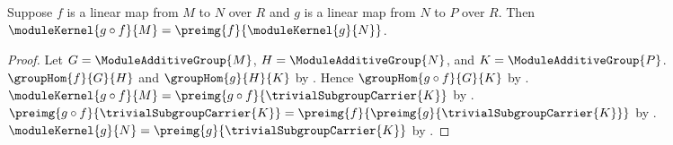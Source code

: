 \begin{theorem}\label{module_kernel_composition}
    Suppose $f$ is a linear map from $M$ to $N$ over $R$ and
        $g$ is a linear map from $N$ to $P$ over $R$.
    Then
        $\moduleKernel{g\circ f}{M}
            =\preimg{f}{\moduleKernel{g}{N}}$.
\end{theorem}
\begin{proof}
    Let $G=\ModuleAdditiveGroup{M}$,
        $H=\ModuleAdditiveGroup{N}$, and
        $K=\ModuleAdditiveGroup{P}$.
    $\groupHom{f}{G}{H}$ and $\groupHom{g}{H}{K}$ by
        .
    Hence $\groupHom{g\circ f}{G}{K}$ by
        .
    $\moduleKernel{g\circ f}{M}
        =\preimg{g\circ f}{\trivialSubgroupCarrier{K}}$ by
        .
    $\preimg{g\circ f}{\trivialSubgroupCarrier{K}}
        =\preimg{f}{\preimg{g}{\trivialSubgroupCarrier{K}}}$ by
        .
    $\moduleKernel{g}{N}
        =\preimg{g}{\trivialSubgroupCarrier{K}}$ by
        .
\end{proof}
